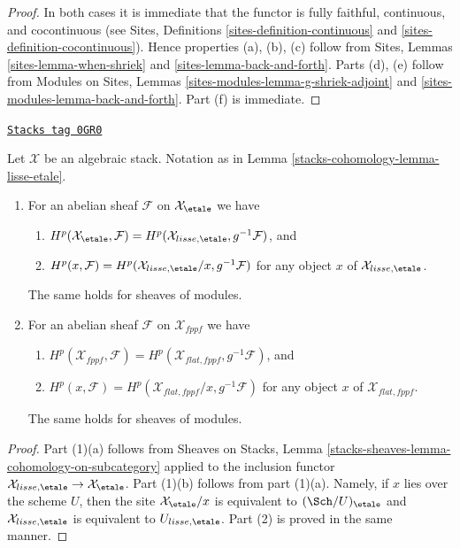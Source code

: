 \begin{proof}
In both cases it is immediate that the functor is fully faithful,
continuous, and cocontinuous (see
Sites, Definitions \ref{sites-definition-continuous} and
\ref{sites-definition-cocontinuous}).
Hence properties (a), (b), (c) follow from
Sites, Lemmas \ref{sites-lemma-when-shriek} and
\ref{sites-lemma-back-and-forth}.
Parts (d), (e) follow from
Modules on Sites, Lemmas \ref{sites-modules-lemma-g-shriek-adjoint} and
\ref{sites-modules-lemma-back-and-forth}.
Part (f) is immediate.
\end{proof}

\begin{lemma}
\label{stacks-cohomology-lemma-lisse-etale-cohomology}
\href{https://stacks.math.columbia.edu/tag/0GR0}{\texttt{Stacks tag 0GR0}}

Let $\mathcal{X}$ be an algebraic stack. Notation as in
Lemma \ref{stacks-cohomology-lemma-lisse-etale}.
\begin{enumerate}
\item For an abelian sheaf $\mathcal{F}$ on $\mathcal{X}_\etale$ we have
\begin{enumerate}
\item $H^p(\mathcal{X}_\etale, \mathcal{F}) =
H^p(\mathcal{X}_{lisse,\etale}, g^{-1}\mathcal{F})$, and
\item $H^p(x, \mathcal{F}) =
H^p(\mathcal{X}_{lisse,\etale}/x, g^{-1}\mathcal{F})$
for any object $x$ of $\mathcal{X}_{lisse,\etale}$.
\end{enumerate}
The same holds for sheaves of modules.
\item For an abelian sheaf $\mathcal{F}$ on $\mathcal{X}_{fppf}$ we have
\begin{enumerate}
\item $H^p(\mathcal{X}_{fppf}, \mathcal{F}) =
H^p(\mathcal{X}_{flat,fppf}, g^{-1}\mathcal{F})$, and
\item $H^p(x, \mathcal{F}) =
H^p(\mathcal{X}_{flat,fppf}/x, g^{-1}\mathcal{F})$
for any object $x$ of $\mathcal{X}_{flat,fppf}$.
\end{enumerate}
The same holds for sheaves of modules.
\end{enumerate}
\end{lemma}

\begin{proof}
Part (1)(a) follows from Sheaves on Stacks, Lemma
\ref{stacks-sheaves-lemma-cohomology-on-subcategory} applied to the inclusion
functor $\mathcal{X}_{lisse,\etale} \to \mathcal{X}_\etale$.
Part (1)(b) follows from part (1)(a). Namely, if $x$ lies over the
scheme $U$, then the site $\mathcal{X}_\etale/x$ is equivalent
to $(\Sch/U)_\etale$ and $\mathcal{X}_{lisse,\etale}$ is equivalent
to $U_{lisse,\etale}$. Part (2) is proved in the same manner.
\end{proof}

